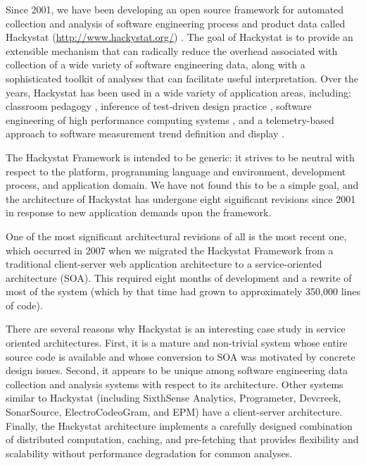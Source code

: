\documentclass[conference,compsoc,peerreview]{IEEEtran}
\begin{document}
Since 2001, we have been developing an open source framework for automated
collection and analysis of software engineering process and product data
called Hackystat (\url{http://www.hackystat.org/})
\cite{csdl2-06-06,csdl2-02-07}.  The goal of Hackystat is to provide an
extensible mechanism that can radically reduce the overhead associated with
collection of a wide variety of software engineering data, along with a
sophisticated toolkit of analyses that can facilitate useful
interpretation.  Over the years, Hackystat has been used in a wide variety
of application areas, including: classroom pedagogy \cite{csdl2-03-12},
inference of test-driven design practice \cite{csdl2-06-13}, software
engineering of high performance computing systems \cite{csdl2-06-08}, and a
telemetry-based approach to software measurement trend definition and
display \cite{csdl2-04-11}.

The Hackystat Framework is intended to be generic: it strives to be neutral
with respect to the platform, programming language and environment,
development process, and application domain.  We have not found this to be
a simple goal, and the architecture of Hackystat has undergone eight
significant revisions since 2001 in response to new application demands
upon the framework.

One of the most significant architectural revisions of all is the most
recent one, which occurred in 2007 when we migrated the Hackystat Framework
from a traditional client-server web application architecture to a
service-oriented architecture (SOA).  This required eight months of
development and a rewrite of most of the system (which by that time had
grown to approximately 350,000 lines of code).  

There are several reasons why Hackystat is an interesting case study in
service oriented architectures.  First, it is a mature and non-trivial
system whose entire source code is available and whose conversion to SOA
was motivated by concrete design issues.  Second, it appears to be unique
among software engineering data collection and analysis systems with
respect to its architecture.  Other systems similar to Hackystat (including
SixthSense Analytics, Programeter, Devcreek, SonarSource, ElectroCodeoGram,
and EPM) have a client-server architecture.  Finally, the Hackystat
architecture implements a carefully designed combination of distributed
computation, caching, and pre-fetching that provides flexibility and
scalability without performance degradation for common analyses.
\end{document}
